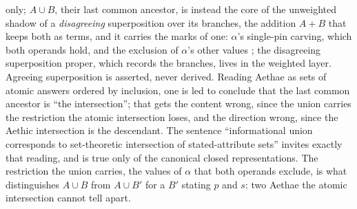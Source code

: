 only; $A \cup B$, their last common ancestor, is instead the core of the unweighted shadow of a \emph{disagreeing} superposition over its branches, the addition $A + B$ that keeps both as terms, and it carries the marks of one: $\alpha$'s single-pin carving, which both operands hold, and the exclusion of $\alpha$'s other values \cite{Aethus}; the disagreeing superposition proper, which records the branches, lives in the weighted layer. Agreeing superposition is asserted, never derived. Reading Aethae as sets of atomic answers ordered by inclusion, one is led to conclude that the last common ancestor is ``the intersection''; that gets the content wrong, since the union carries the restriction the atomic intersection loses, and the direction wrong, since the Aethic intersection is the descendant. The sentence ``informational union corresponds to set-theoretic intersection of stated-attribute sets'' invites exactly that reading, and is true only of the canonical closed representations. The restriction the union carries, the values of $\alpha$ that both operands exclude, is what distinguishes $A \cup B$ from $A \cup B'$ for a $B'$ stating $p$ and $s$: two Aethae the atomic intersection cannot tell apart.

